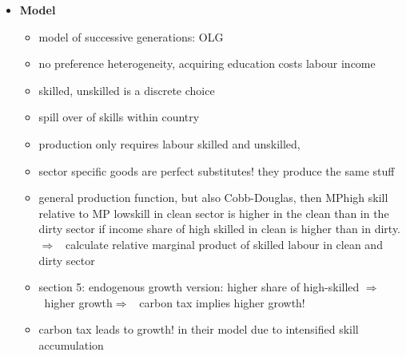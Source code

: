 \documentclass[12pt]{article}
\newcommand{\ar}{$\Rightarrow$ \ }
\begin{document}
\begin{itemize}
\begin{itemize}
\item \textbf{Model}
\begin{itemize}
\item model of successive generations: OLG
\item no preference heterogeneity, acquiring education costs labour income
\item skilled, unskilled is a discrete choice
\item spill over of skills within country
\item production only requires labour skilled and unskilled,
\item sector specific goods are perfect substitutes! they produce the same stuff
\item general production function, but also Cobb-Douglas, then MPhigh skill relative to MP lowskill in clean sector is higher in the clean than in the dirty sector if income share of high skilled in clean is higher than in dirty. \ar calculate relative marginal product of skilled labour in clean and dirty sector
\item section 5: endogenous growth version: higher share of high-skilled \ar higher growth\ar carbon tax implies higher growth!
\item carbon tax leads to growth! in their model due to intensified skill accumulation
\end{itemize}
\end{itemize}


\end{itemize}
\end{document}
